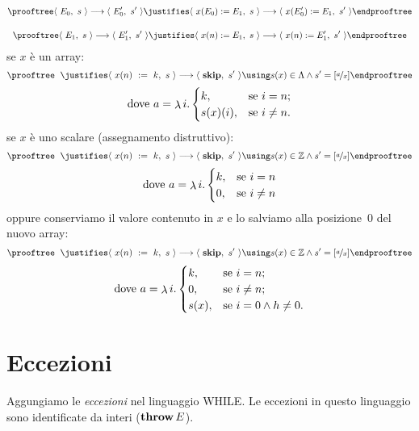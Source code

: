 \begin{gather*}
  \prooftree
    \config{E_0}{s} \ssarrow \config{E_0'}{s'}
  \justifies
    \config{x(E_0) \weq E_1}{s} \ssarrow \config{x(E_0') \weq E_1}{s'}
  \endprooftree \\[12pt]
  \prooftree
    \config{E_1}{s} \ssarrow \config{E_1'}{s'}
  \justifies
    \config{x(n) \weq E_1}{s} \ssarrow \config{x(n) \weq E_1'}{s'}
  \endprooftree
\end{gather*}
se $x$ è un array:
\[
  \prooftree
  \nohyp
  \justifies
    \config{x(n)\ \weq\ k}{s} \ssarrow \config{\kw{skip}}{s'}
  \using
    s(x) \in \Lambda \land s' = \substt{a}{x}
  \endprooftree
\]
\begin{align*}
  \text{dove } a = \mathop{\lambda}\nolimits i.
  \begin{cases}
    k, &\text{se $i = n$;} \\
    s(x)(i), &\text{se $i \neq n$.}
  \end{cases}
\end{align*}
se $x$ è uno scalare (assegnamento distruttivo):
\[
  \prooftree
  \nohyp
  \justifies
    \config{x(n)\ \weq\ k}{s} \ssarrow \config{\kw{skip}}{s'}
  \using
    s(x) \in \Zset \land s' = \substt{a}{x}
  \endprooftree
\]
\begin{align*}
  \text{dove } a = \mathop{\lambda}\nolimits i.
  \begin{cases}
    k, &\text{se $i = n$} \\
    0, &\text{se $i \neq n$}
  \end{cases}
\end{align*}
oppure conserviamo il valore contenuto in $x$ e lo salviamo
alla posizione~0 del nuovo array:
\[
  \prooftree
  \nohyp
  \justifies
    \config{x(n)\ \weq\ k}{s} \ssarrow \config{\kw{skip}}{s'}
  \using
    s(x) \in \Zset \land s' = \substt{a}{x}
  \endprooftree
\]
\begin{align*}
  \text{dove } a = \mathop{\lambda}\nolimits i.
  \begin{cases}
    k, &\text{se $i = n$;} \\
    0, &\text{se $i \neq n$;} \\
    s(x), &\text{se $i = 0 \land h \neq 0$.}
  \end{cases}
\end{align*}

\section{Eccezioni}

Aggungiamo le \emph{eccezioni} nel linguaggio WHILE. Le eccezioni in
questo linguaggio sono identificate da interi ($\mathop{\textup{\textbf{throw}}} E$).

